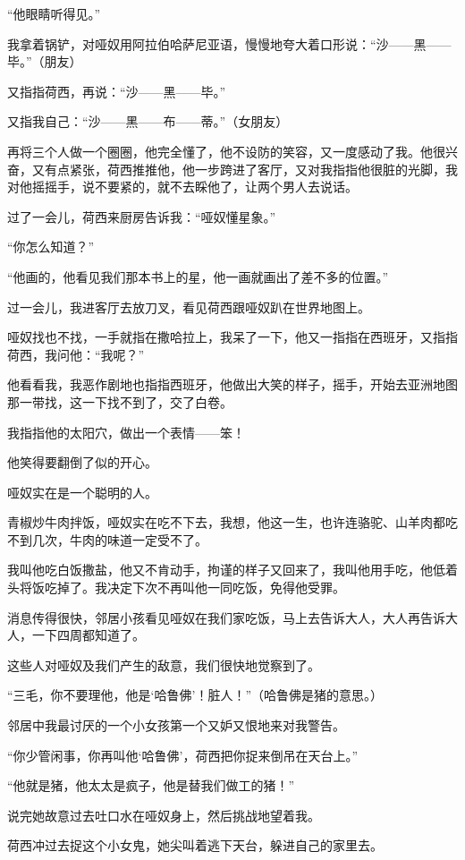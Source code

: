 \par “他眼睛听得见。”
\par 我拿着锅铲，对哑奴用阿拉伯哈萨尼亚语，慢慢地夸大着口形说：“沙——黑——毕。”（朋友）
\par 又指指荷西，再说：“沙——黑——毕。”
\par 又指我自己：“沙——黑——布——蒂。”（女朋友）
\par 再将三个人做一个圈圈，他完全懂了，他不设防的笑容，又一度感动了我。他很兴奋，又有点紧张，荷西推推他，他一步跨进了客厅，又对我指指他很脏的光脚，我对他摇摇手，说不要紧的，就不去睬他了，让两个男人去说话。
\par 过了一会儿，荷西来厨房告诉我：“哑奴懂星象。”
\par “你怎么知道？”
\par “他画的，他看见我们那本书上的星，他一画就画出了差不多的位置。”
\par 过一会儿，我进客厅去放刀叉，看见荷西跟哑奴趴在世界地图上。
\par 哑奴找也不找，一手就指在撒哈拉上，我呆了一下，他又一指指在西班牙，又指指荷西，我问他：“我呢？”
\par 他看看我，我恶作剧地也指指西班牙，他做出大笑的样子，摇手，开始去亚洲地图那一带找，这一下找不到了，交了白卷。
\par 我指指他的太阳穴，做出一个表情——笨！
\par 他笑得要翻倒了似的开心。
\par 哑奴实在是一个聪明的人。
\par 青椒炒牛肉拌饭，哑奴实在吃不下去，我想，他这一生，也许连骆驼、山羊肉都吃不到几次，牛肉的味道一定受不了。
\par 我叫他吃白饭撒盐，他又不肯动手，拘谨的样子又回来了，我叫他用手吃，他低着头将饭吃掉了。我决定下次不再叫他一同吃饭，免得他受罪。
\par 消息传得很快，邻居小孩看见哑奴在我们家吃饭，马上去告诉大人，大人再告诉大人，一下四周都知道了。
\par 这些人对哑奴及我们产生的敌意，我们很快地觉察到了。
\par “三毛，你不要理他，他是‘哈鲁佛’！脏人！”（哈鲁佛是猪的意思。）
\par 邻居中我最讨厌的一个小女孩第一个又妒又恨地来对我警告。
\par “你少管闲事，你再叫他‘哈鲁佛’，荷西把你捉来倒吊在天台上。”
\par “他就是猪，他太太是疯子，他是替我们做工的猪！”
\par 说完她故意过去吐口水在哑奴身上，然后挑战地望着我。
\par 荷西冲过去捉这个小女鬼，她尖叫着逃下天台，躲进自己的家里去。
